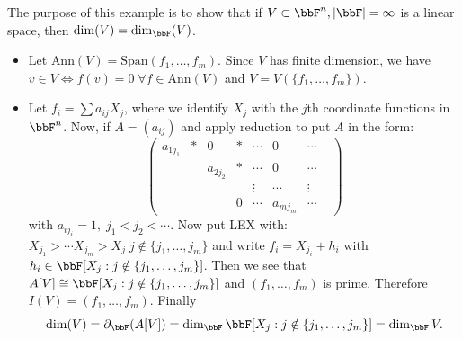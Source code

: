 \begin{itemize}
\begin{example}
    The purpose of this example is to show that if $V\subset \bbF^n,|\bbF|=\infty$ is a linear space, then 
    $\dim(V)=\dim_{\bbF}(V)$.
    \begin{itemize}
        \item Let $\text{Ann}(V)=\text{Span}(f_1,\dots, f_m)$. Since $V$ has finite dimension, we have
        $v\in V\iff f(v)=0\;\forall f\in\text{Ann}(V)$ and $V=V(\{f_1,\dots,f_m\})$.
        \item Let $f_i=\sum a_{ij}X_j$, where we identify $X_j$ with the $j$th coordinate functions in $\bbF^n$. 
        Now, if $A=(a_{ij})$ and apply reduction to put $A$ in the form:
        \begin{equation}
            \begin{pmatrix}
                a_{1j_1}&*&0&*&\cdots&0&\cdots\\
                &&a_{2j_2}&*&\cdots&0&\cdots\\
                &&&&\vdots&\cdots&\vdots&\\
                &&&0&\cdots&a_{mj_m}&\cdots
            \end{pmatrix}
        \end{equation}
        with $a_{ij_i}=1,\;j_1<j_2<\cdots$. Now put LEX with: 
        $X_{j_1}>\cdots X_{j_m}>X_{j}\;j\notin\{j_1,\dots,j_m\}$ and write 
        $f_i = X_{j_i}+h_i$ with $h_i\in\bbF[X_j:j\notin\{j_1,\dots, j_m\}]$. Then we see that 
        $A[V]\cong\bbF[X_j:j\notin\{j_1,\dots, j_m\}]$ and $(f_1,\dots,f_m)$ is prime. Therefore 
        $I(V)=(f_1,\dots, f_m)$. Finally 
        \begin{equation}
            \dim(V)=\partial_{\bbF}(A[V]) = \dim_{\bbF}\bbF[X_j:j\notin\{j_1,\dots, j_m\}] = \dim_{\bbF}V.
        \end{equation}
    \end{itemize}
\end{example}
\end{itemize}


